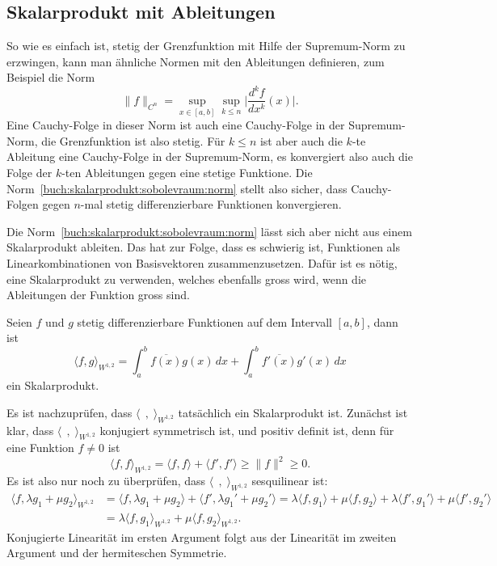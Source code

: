 \subsection{Skalarprodukt mit Ableitungen}
So wie es einfach ist, stetig der Grenzfunktion mit Hilfe der Supremum-Norm
zu erzwingen, kann man ähnliche Normen mit den Ableitungen definieren, zum
Beispiel die Norm
\begin{equation}
\|f\|_{C^n}
=
\sup_{x\in [a,b]}\sup_{k\le n} \biggl|\frac{d^kf}{dx^k}(x)\biggr|.
\label{buch:skalarprodukt:sobolevraum:norm}
\end{equation}
Eine Cauchy-Folge in dieser Norm ist auch eine Cauchy-Folge in der
Supremum-Norm, die Grenzfunktion ist also stetig.
Für $k\le n$ ist aber auch die $k$-te Ableitung eine Cauchy-Folge
in der Supremum-Norm, es konvergiert also auch die Folge der $k$-ten
Ableitungen gegen eine stetige Funktione.
Die Norm~\eqref{buch:skalarprodukt:sobolevraum:norm} stellt also sicher,
dass Cauchy-Folgen gegen $n$-mal stetig differenzierbare Funktionen
konvergieren.

Die Norm~\eqref{buch:skalarprodukt:sobolevraum:norm} lässt sich aber
nicht aus einem Skalarprodukt ableiten.
Das hat zur Folge, dass es schwierig ist, Funktionen als Linearkombinationen
von Basisvektoren zusammenzusetzen.
Dafür ist es nötig, eine Skalarprodukt zu verwenden, welches ebenfalls
gross wird, wenn die Ableitungen der Funktion gross sind.

\begin{definition}
Seien $f$ und $g$ stetig differenzierbare Funktionen auf dem Intervall
$[a,b]$, dann ist
\begin{equation}
\langle f,g\rangle_{W^{1,2}}
=
\int_a^b \overline{f(x)} g(x)\,dx
+
\int_a^b \overline{f'(x)} g'(x)\,dx
\label{buch:skalarprodukt:sobolevraum:eqn:W12produkt}
\end{equation}
ein Skalarprodukt.
\end{definition}

Es ist nachzuprüfen, dass $\langle\;\,,\;\rangle_{W^{1,2}}$ tatsächlich ein
Skalarprodukt ist.
Zunächst ist klar, dass $\langle\;\,,\;\rangle_{W^{1,2}}$ konjugiert
symmetrisch ist, und positiv definit ist, denn für eine Funktion $f\ne 0$
ist
\[
\langle f,f\rangle_{W^{1,2}}
=
\langle f,f\rangle + \langle f',f'\rangle
\ge
\|f\|^2
\ge
0.
\]
Es ist also nur noch zu überprüfen, dass $\langle\;\,,\;\rangle_{W^{1,2}}$ 
sesquilinear ist:
\begin{align*}
\langle f,\lambda g_1+\mu g_2\rangle_{W^{1,2}}
&=
\langle f,\lambda g_1+\mu g_2\rangle + \langle f',\lambda g_1'+\mu g_2'\rangle
=
\lambda \langle f,g_1\rangle
+
\mu \langle f,g_2\rangle
+
\lambda \langle f',g_1'\rangle
+
\mu \langle f',g_2'\rangle
\\
&=
\lambda \langle f,g_1\rangle_{W^{1,2}}
+
\mu \langle f,g_2\rangle_{W^{1,2}}.
\end{align*}
Konjugierte Linearität im ersten Argument folgt aus der Linearität
im zweiten Argument und der hermiteschen Symmetrie.

